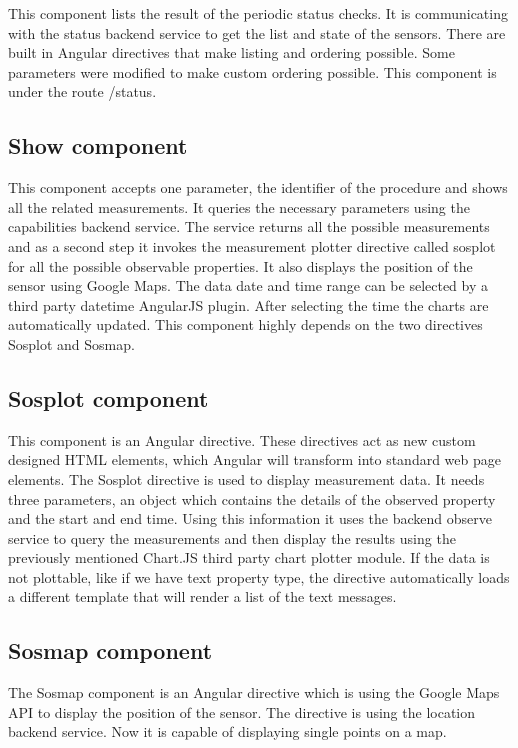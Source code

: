 This component lists the result of the periodic status checks. 
It is communicating with the status backend service to get the list and state of the sensors.
There are built in Angular directives that make listing and ordering possible. Some parameters were modified to make custom ordering possible. This component is under the route /status.

\subsection{Show component}

This component accepts one parameter, the identifier of the procedure and shows all the related measurements. It queries the necessary parameters using the capabilities backend service. The service returns all the possible measurements and as a second step it invokes the measurement plotter directive called sosplot for all the possible observable properties.
It also displays the position of the sensor using Google Maps. 
The data date and time range can be selected by a third party datetime AngularJS plugin. After selecting the time the charts are automatically updated. This component highly depends on the two directives Sosplot and Sosmap.

\subsection{Sosplot component}
This component is an Angular directive. These directives act as new custom designed HTML elements, which Angular will transform into standard web page elements. The Sosplot directive is used to display measurement data. It needs three parameters, an object which contains the details of the observed property and the start and end time. Using this information it uses the backend observe service to query the measurements and then display the results using the previously mentioned Chart.JS third party chart plotter module. If the data is not plottable, like if we have text property type, the directive automatically loads a different template that will render a list of the text messages. 

\subsection{Sosmap component}
The Sosmap component is an Angular directive which is using the Google Maps API to display the position of the sensor. The directive is using the location backend service. Now it is capable of displaying single points on a map.

